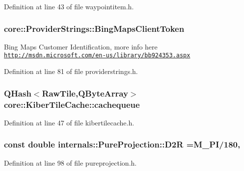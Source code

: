 Definition at line 43 of file waypointitem.\-h.

\hypertarget{group___o_p_map_widget_ga4c3a944c12deba7b13251f0c04685ac6}{
\subsubsection[{Bing\-Maps\-Client\-Token}]{ core\-::\-Provider\-Strings\-::\-Bing\-Maps\-Client\-Token}}\label{group___o_p_map_widget_ga4c3a944c12deba7b13251f0c04685ac6}


Bing Maps Customer Identification, more info here \href{http://msdn.microsoft.com/en-us/library/bb924353.aspx}{\tt http\-://msdn.\-microsoft.\-com/en-\/us/library/bb924353.\-aspx} 



Definition at line 81 of file providerstrings.\-h.

\hypertarget{group___o_p_map_widget_ga632c3be1045d7e97d09885aba0c18100}{
\subsubsection[{cachequeue}]{\setlength{\rightskip}{0pt plus 5cm}Q\-Hash$<$Raw\-Tile,Q\-Byte\-Array$>$ core\-::\-Kiber\-Tile\-Cache\-::cachequeue}}\label{group___o_p_map_widget_ga632c3be1045d7e97d09885aba0c18100}


Definition at line 47 of file kibertilecache.\-h.

\hypertarget{group___o_p_map_widget_ga52ec5ac7446a549728bf6e9c798ed6f6}{
\subsubsection[{D2\-R}]{\setlength{\rightskip}{0pt plus 5cm}const {\bf double} internals\-::\-Pure\-Projection\-::\-D2\-R =M\-\_\-\-P\-I/180\hspace{0.3cm}{\ttfamily [static]}, {\ttfamily [protected]}}}\label{group___o_p_map_widget_ga52ec5ac7446a549728bf6e9c798ed6f6}


Definition at line 98 of file pureprojection.\-h.

